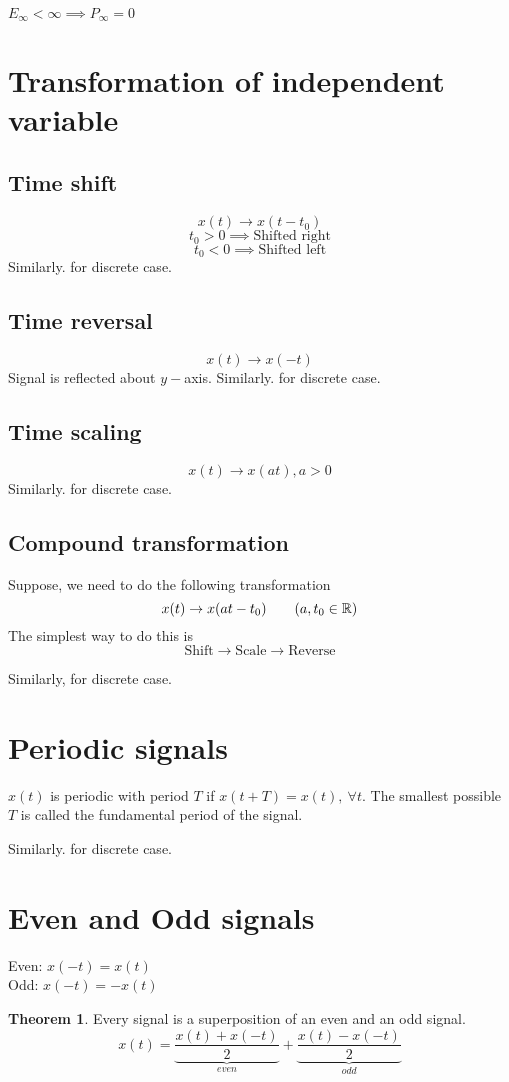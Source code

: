 \documentclass[10pt, a4paper]{extarticle}
\theoremstyle{definition}
\newtheorem*{thm}{Theorem}
\begin{document}
$E_\infty<\infty\implies P_\infty=0$

\section{Transformation of independent variable}
\subsection{Time shift}
\[x(t)\to x(t-t_0)\]
\[t_0>0\implies\text{Shifted right}\]
\[t_0<0\implies\text{Shifted left}\]
Similarly. for discrete case.
\subsection{Time reversal}
\[x(t)\to x(-t)\]
Signal is reflected about $y-$axis.
Similarly. for discrete case.
\subsection{Time scaling}
\[x(t)\to x(at),a>0\]
Similarly. for discrete case.
\subsection{Compound transformation}
Suppose, we need to do the following transformation\[x(t)\to x(at-t_0)\tag*{($a,t_0\in \mathbb{R}$)}\]
The simplest way to do this is\[\text{Shift}\to\text{Scale}\to\text{Reverse}\]

Similarly, for discrete case.

\section{Periodic signals}
$x(t)$ is periodic with period $T$ if $x(t+T)=x(t),\ \forall t$. The smallest possible $T$ is called the fundamental period of the signal.

Similarly. for discrete case.
\section{Even and Odd signals}
Even: $x(-t)=x(t)$\\
Odd: $x(-t)=-x(t)$

\begin{thm} Every signal is a superposition of an even and an odd signal.
	\[x(t)=\underbrace{\frac{x(t)+x(-t)}{2}}_{even}+\underbrace{\frac{x(t)-x(-t)}{2}}_{odd}\]
\end{thm}
\end{document}
